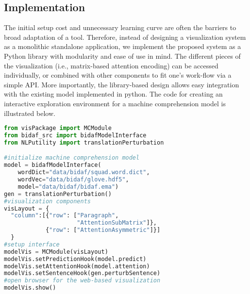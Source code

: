 \subsection{Implementation}
The initial setup cost and unnecessary learning curve are often the barriers to broad adaptation of a tool. 
Therefore, instead of designing a visualization system as a monolithic standalone application, 
we implement the proposed system as a Python library with modularity and ease of use in mind.
The different pieces of the visualization (i.e., matrix-based attention encoding) can be accessed individually, 
or combined with other components to fit one's work-flow via a simple API.
More importantly, the library-based design allows easy integration with the existing model implemented in python.
The code for creating an interactive exploration environment for a machine comprehension model is illustrated below.

\begin{lstlisting}[language=Python, caption=Code for setting up the visualization system shown in Figure~\ref{fig:MCexample}(a).]
from visPackage import MCModule
from bidaf_src import bidafModelInterface
from NLPutility import translationPerturbation

#initialize machine comprehension model
model = bidafModelInterface(
    wordDict="data/bidaf/squad.word.dict",
    wordVec="data/bidaf/glove.hdf5",
    model="data/bidaf/bidaf.ema")
gen = translationPerturbation()
#visualization components
visLayout = {
  "column":[{"row": ["Paragraph", 
                     "AttentionSubMatrix"]},
            {"row": ["AttentionAsymmetric"]}]
  }
#setup interface
modelVis = MCModule(visLayout)
modelVis.setPredictionHook(model.predict)
modelVis.setAttentionHook(model.attention)
modelVis.setSentenceHook(gen.perturbSentence)
#open browser for the web-based visualization
modelVis.show()
\end{lstlisting}




